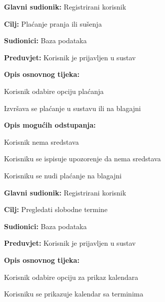 \noindent {}
\begin{packed_item}
	
	\item \textbf{Glavni sudionik: } Registrirani korisnik
	\item  \textbf{Cilj:} Plaćanje pranja ili sušenja
	\item  \textbf{Sudionici:} Baza podataka
	\item  \textbf{Preduvjet:} Korisnik je prijavljen u sustav
	\item  \textbf{Opis osnovnog tijeka:}
	
	\item[] \begin{packed_enum}
		
		\item Korisnik odabire opciju plaćanja
		\item Izvršava se plaćanje u sustavu ili na blagajni
		
	\end{packed_enum}
	
	\item  \textbf{Opis mogućih odstupanja:}
	
	\item[] \begin{packed_item}
		
		\item[2.a] Korisnik nema sredstava
		\item[] \begin{packed_enum}
			
			\item Korisniku se ispisuje upozorenje da nema sredstava
			\item Korisniku se nudi plaćanje na blagajni
			
		\end{packed_enum}
		
	\end{packed_item}
\end{packed_item}


\noindent {}
\begin{packed_item}
	
	\item \textbf{Glavni sudionik: }Registrirani korisnik
	\item  \textbf{Cilj:} Pregledati slobodne termine
	\item  \textbf{Sudionici:} Baza podataka
	\item  \textbf{Preduvjet:} Korisnik je prijavljen u sustav
	\item  \textbf{Opis osnovnog tijeka:}
	
	\item[] \begin{packed_enum}
		
		\item Korisnik odabire opciju za prikaz kalendara
		\item Korisniku se prikazuje kalendar sa terminima

	\end{packed_enum}
	
\end{packed_item}

